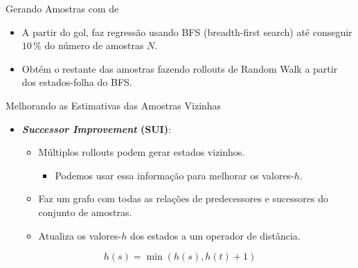 \documentclass{beamer}
\begin{document}
\begin{frame}{Gerando Amostras com \bfsrw de \cite{Bettker.etal/2022}}
\begin{itemize}
  \item A partir do gol, faz \alert{regressão} usando \alert{BFS} (breadth-first search) até conseguir $10\,\%$ do número de amostras $N$.
  \pause
  \item Obtém o restante das amostras fazendo rollouts de \alert{Random Walk} a partir dos \alert{estados-folha} do BFS.
\end{itemize}
\end{frame}

\begin{frame}{Melhorando as Estimativas das Amostras Vizinhas}
\begin{itemize}
  \item \textbf{\emph{Successor Improvement} (SUI)}:
  \begin{itemize}
    \item Múltiplos rollouts podem gerar \alert{estados vizinhos}.
    \begin{itemize}
      \item Podemos usar essa informação para melhorar os valores-$h$.
    \end{itemize}
    \item Faz um \alert{grafo} com todas as relações de predecessores e sucessores do conjunto de amostras.
    \item Atualiza os valores-$h$ dos estados a \alert{um operador de distância}.
  \end{itemize}
\end{itemize}
 $$h(s) = \min(h(s), h(t)+1)$$
\end{frame}
\end{document}
